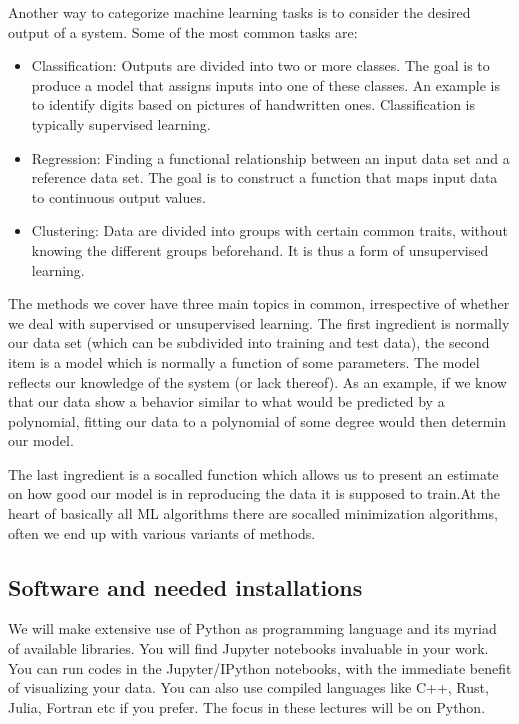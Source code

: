\documentclass[letterpaper,10pt,english]{sphinxmanual}
\begin{document}
Another way to categorize machine learning tasks is to consider the
desired output of a system.  Some of the most common tasks are:
\begin{itemize}
\item {} 
Classification: Outputs are divided into two or more classes. The goal is to   produce a model that assigns inputs into one of these classes. An example is to identify  digits based on pictures of hand\sphinxhyphen{}written ones. Classification is typically supervised learning.

\item {} 
Regression: Finding a functional relationship between an input data set and a reference data set.   The goal is to construct a function that maps input data to continuous output values.

\item {} 
Clustering: Data are divided into groups with certain common traits, without knowing the different groups beforehand.  It is thus a form of unsupervised learning.

\end{itemize}

The methods we cover have three main topics in common, irrespective of
whether we deal with supervised or unsupervised learning. The first
ingredient is normally our data set (which can be subdivided into
training and test data), the second item is a model which is normally a
function of some parameters.  The model reflects our knowledge of the system (or lack thereof). As an example, if we know that our data show a behavior similar to what would be predicted by a polynomial, fitting our data to a polynomial of some degree would then determin our model.

The last ingredient is a so\sphinxhyphen{}called 
function which allows us to present an estimate on how good our model
is in reproducing the data it is supposed to train.At the heart of basically all ML algorithms there are so\sphinxhyphen{}called minimization algorithms, often we end up with various variants of  methods.


\subsection{Software and needed installations}
\label{\detokenize{chapter3:software-and-needed-installations}}
We will make extensive use of Python as programming language and its
myriad of available libraries.  You will find
Jupyter notebooks invaluable in your work.  You can run 
codes in the Jupyter/IPython notebooks, with the immediate benefit of
visualizing your data. You can also use compiled languages like C++,
Rust, Julia, Fortran etc if you prefer. The focus in these lectures will be
on Python.
\end{document}
